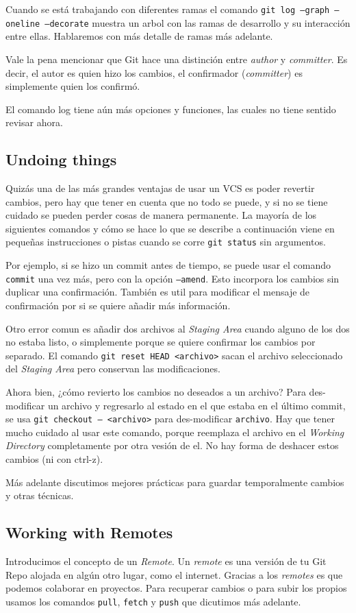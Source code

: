 \documentclass[spanish, 12pt, a4paper]{article}
\begin{document}
Cuando se está trabajando con diferentes ramas el comando \texttt{git log --graph --oneline --decorate} muestra un arbol con las ramas de desarrollo y su interacción entre ellas.
Hablaremos con más detalle de ramas más adelante.

Vale la pena mencionar que Git hace una distinción entre \textit{author} y \textit{committer}.
Es decir, el autor es quien hizo los cambios, el confirmador (\textit{committer}) es simplemente quien los confirmó.

El comando log tiene aún más opciones y funciones, las cuales no tiene sentido revisar ahora.

\subsection{Undoing things}
Quizás una de las más grandes ventajas de usar un VCS es poder revertir cambios, pero hay que tener en cuenta que no todo se puede, y si no se tiene cuidado se pueden perder cosas de manera permanente.
La mayoría de los siguientes comandos y cómo se hace lo que se describe a continuación viene en pequeñas instrucciones o pistas cuando se corre \texttt{git status} sin argumentos.

Por ejemplo, si se hizo un commit antes de tiempo, se puede usar el comando \texttt{commit} una vez más, pero con la opción \texttt{--amend}.
Esto incorpora los cambios sin duplicar una confirmación.
También es util para modificar el mensaje de confirmación por si se quiere añadir más información.

Otro error comun es añadir dos archivos al \textit{Staging Area} cuando alguno de los dos no estaba listo, o simplemente porque se quiere confirmar los cambios por separado.
El comando \texttt{git reset HEAD <archivo>} sacan el archivo seleccionado del \textit{Staging Area} pero conservan las modificaciones.

Ahora bien, ¿cómo revierto los cambios no deseados a un archivo?
Para des-modificar un archivo y regresarlo al estado en el que estaba en el último commit, se usa \texttt{git checkout -- <archivo>} para des-modificar \texttt{archivo}.
Hay que tener mucho cuidado al usar este comando, porque reemplaza el archivo en el \textit{Working Directory} completamente por otra vesión de el. No hay forma de deshacer estos cambios (ni con ctrl-z).

Más adelante discutimos mejores prácticas para guardar temporalmente cambios y otras técnicas.

\subsection{Working with Remotes}
Introducimos el concepto de un \textit{Remote}.
Un \textit{remote} es una versión de tu Git Repo alojada en algún otro lugar, como el internet.
Gracias a los \textit{remotes} es que podemos colaborar en proyectos.
Para recuperar cambios o para subir los propios usamos los comandos \texttt{pull}, \texttt{fetch} y \texttt{push} que dicutimos más adelante.
\end{document}
